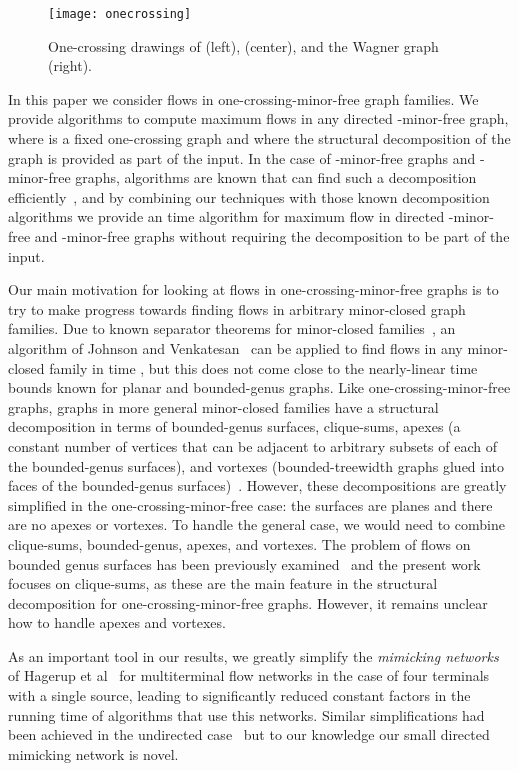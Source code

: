 \documentclass[runningheads]{llncs}
\begin{document}
\begin{figure}[t]
\centering\texttt{[image: onecrossing]}
\caption{One-crossing drawings of  (left),  (center), and the Wagner graph (right).}
\label{fig:onecrossing}
\end{figure}

In this paper we consider flows in one-crossing-minor-free graph families. We provide  algorithms to compute maximum flows in any directed -minor-free graph, where  is a fixed one-crossing graph and where the structural decomposition of the graph is provided as part of the input. In the case of -minor-free graphs and -minor-free graphs, algorithms are known that can find such a decomposition efficiently~\cite{asano85,rl-ork5mfg-08}, and by combining our techniques with those known decomposition algorithms we provide an  time algorithm for maximum flow in directed -minor-free and -minor-free graphs without requiring the decomposition to be part of the input.

Our main motivation for looking at flows in one-crossing-minor-free graphs is to try to make progress towards finding flows in arbitrary minor-closed graph families. Due to known separator theorems for minor-closed families~\cite{ast-stgema-90}, an algorithm of Johnson and Venkatesan~\cite{jv-udcffdpn-82} can be applied to find flows in any minor-closed family in time , but this does not come close to the nearly-linear time bounds known for planar and bounded-genus graphs.
Like one-crossing-minor-free graphs, graphs in more general minor-closed families have a structural decomposition in terms of bounded-genus surfaces, clique-sums, apexes (a constant number of vertices that can be adjacent to arbitrary subsets of each of the bounded-genus surfaces), and vortexes (bounded-treewidth graphs glued into faces of the bounded-genus surfaces)~\cite{dhk-agmtdac-05,rs-gm16enpg-03}. However, these decompositions are greatly simplified in the one-crossing-minor-free case: the surfaces are planes and there are no apexes or vortexes. To handle the general case, we would need to combine clique-sums, bounded-genus, apexes, and vortexes.  The problem of flows on bounded genus surfaces has been previously examined~\cite{cen-hfcc-09,cen-mcshc-09} and the present work focuses on clique-sums, as these are the main feature in the structural decomposition for one-crossing-minor-free graphs. However, it remains unclear how to handle apexes and vortexes.

As an important tool in our results, we greatly simplify the \emph{mimicking networks} of Hagerup et al~\cite{hknr-cmfnc-98} for multiterminal flow networks in the case of four terminals with a single source, leading to significantly reduced constant factors in the running time of algorithms that use this networks. Similar simplifications had been achieved in the undirected case~\cite{cswz-cmn-00} but to our knowledge our small directed mimicking network is novel.
\end{document}
